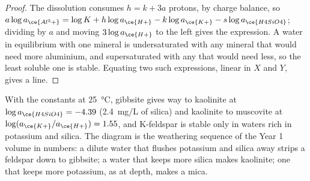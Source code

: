 \begin{proof}
The dissolution consumes $h = k + 3a$ protons, by charge balance, so $a\log
a_{\ce{Al^3+}} = \log K + h\log a_{\ce{H+}} - k\log a_{\ce{K+}} - s\log
a_{\ce{H4SiO4}}$; dividing by $a$ and moving $3\log a_{\ce{H+}}$ to the left
gives the expression. A water in equilibrium with one mineral is
undersaturated with any mineral that would need more aluminium, and
supersaturated with any that would need less, so the least soluble one is
stable. Equating two such expressions, linear in $X$ and $Y$, gives a line.
\end{proof}

With the constants at \qty{25}{\celsius}, gibbsite gives way to kaolinite at
$\log a_{\ce{H4SiO4}} = -4.39$ (\qty{2.4}{mg/L} of silica) and kaolinite to
muscovite at $\log(a_{\ce{K+}}/a_{\ce{H+}}) = 1.55$, and K-feldspar is stable
only in waters rich in potassium and silica. The diagram is the weathering
sequence of the Year 1 volume in numbers: a dilute water that flushes
potassium and silica away strips a feldspar down to gibbsite; a water that
keeps more silica makes kaolinite; one that keeps more potassium, as at depth,
makes a mica.

